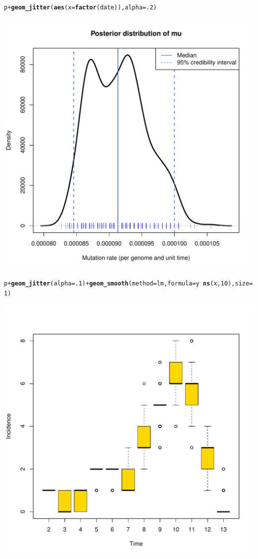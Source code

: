 \documentclass{article}\usepackage[]{graphicx}\usepackage[]{color}
\makeatletter
\newcommand{\hlnum}[1]{\textcolor[rgb]{0.686,0.059,0.569}{#1}}%
\newcommand{\hlopt}[1]{\textcolor[rgb]{0,0,0}{#1}}%
\newcommand{\hlstd}[1]{\textcolor[rgb]{0.345,0.345,0.345}{#1}}%
\newcommand{\hlkwc}[1]{\textcolor[rgb]{0.333,0.667,0.333}{#1}}%
\newcommand{\hlkwd}[1]{\textcolor[rgb]{0.737,0.353,0.396}{\textbf{#1}}}%
\newenvironment{kframe}{%
 \def\at@end@of@kframe{}%
 \ifinner\ifhmode%
  \def\at@end@of@kframe{\end{minipage}}%
  \begin{minipage}{\columnwidth}%
 \fi\fi%
 \def\FrameCommand##1{\hskip\@totalleftmargin \hskip-\fboxsep
 \colorbox{shadecolor}{##1}\hskip-\fboxsep
     \hskip-\linewidth \hskip-\@totalleftmargin \hskip\columnwidth}%
 \MakeFramed {\advance\hsize-\width
   \@totalleftmargin\z@ \linewidth\hsize
   \@setminipage}}%
 {\par\unskip\endMakeFramed%
 \at@end@of@kframe}
\newenvironment{knitrout}{}{} %
\makeatother
\begin{document}
\begin{knitrout}
\color{fgcolor}\begin{kframe}
\begin{alltt}
\hlstd{p} \hlopt{+} \hlkwd{geom_jitter}\hlstd{(}\hlkwd{aes}\hlstd{(}\hlkwc{x}\hlstd{=}\hlkwd{factor}\hlstd{(date)),} \hlkwc{alpha}\hlstd{=}\hlnum{.2}\hlstd{)}
\end{alltt}
\end{kframe}

{\centering \includegraphics[width=.6\textwidth]{figs/unnamed-chunk-44} 

}



\end{knitrout}


\begin{knitrout}
\color{fgcolor}\begin{kframe}
\begin{alltt}
\hlstd{p} \hlopt{+} \hlkwd{geom_jitter}\hlstd{(}\hlkwc{alpha}\hlstd{=}\hlnum{.1}\hlstd{)} \hlopt{+} \hlkwd{geom_smooth}\hlstd{(}\hlkwc{method}\hlstd{=lm,} \hlkwc{formula}\hlstd{=y}\hlopt{~}\hlkwd{ns}\hlstd{(x,}\hlnum{10}\hlstd{),} \hlkwc{size}\hlstd{=}\hlnum{1}\hlstd{)}
\end{alltt}
\end{kframe}

{\centering \includegraphics[width=.6\textwidth]{figs/unnamed-chunk-45} 

}



\end{knitrout}
\end{document}
